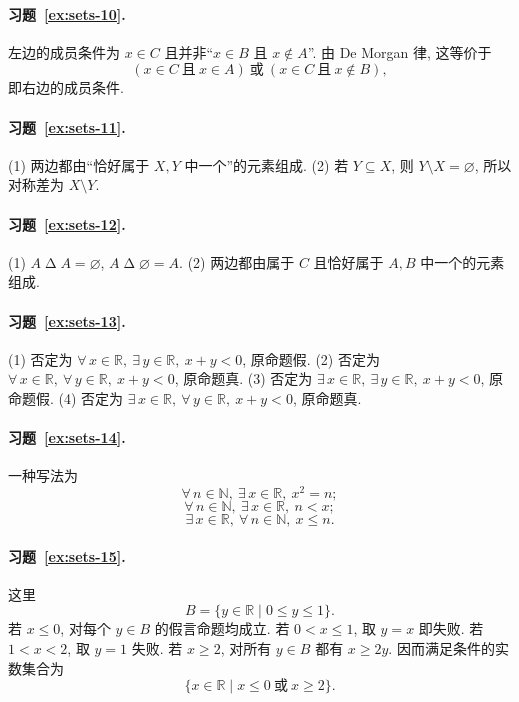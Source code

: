 \documentclass[usesamecnt, thmcnt=section, lang=cn, newtx, 10pt, scheme=chinese]{elegantbook}
\begin{document}
\paragraph*{习题~\ref{ex:sets-10}.}
左边的成员条件为 $x\in C$ 且并非``$x\in B$ 且 $x\notin A$''. 由 De Morgan 律, 这等价于
\[
 (x\in C\ \text{且}\ x\in A)
 \ \text{或}\ 
 (x\in C\ \text{且}\ x\notin B),
\]
即右边的成员条件.

\paragraph*{习题~\ref{ex:sets-11}.}
(1) 两边都由``恰好属于 $X,Y$ 中一个''的元素组成. (2) 若 $Y\subseteq X$, 则 $Y\setminus X=\varnothing$, 所以对称差为 $X\setminus Y$.

\paragraph*{习题~\ref{ex:sets-12}.}
(1) $A\mathbin\Delta A=\varnothing$, $A\mathbin\Delta\varnothing=A$. (2) 两边都由属于 $C$ 且恰好属于 $A,B$ 中一个的元素组成.

\paragraph*{习题~\ref{ex:sets-13}.}
(1) 否定为 $\forall\,x\in\mathbb R,\ \exists\,y\in\mathbb R,\ x+y<0$, 原命题假. (2) 否定为 $\forall\,x\in\mathbb R,\ \forall\,y\in\mathbb R,\ x+y<0$, 原命题真. (3) 否定为 $\exists\,x\in\mathbb R,\ \exists\,y\in\mathbb R,\ x+y<0$, 原命题假. (4) 否定为 $\exists\,x\in\mathbb R,\ \forall\,y\in\mathbb R,\ x+y<0$, 原命题真.

\paragraph*{习题~\ref{ex:sets-14}.}
一种写法为
\[
 \forall\,n\in\mathbb N,\ \exists\,x\in\mathbb R,\ x^2=n;
\]
\[
 \forall\,n\in\mathbb N,\ \exists\,x\in\mathbb R,\ n<x;
\]
\[
 \exists\,x\in\mathbb R,\ \forall\,n\in\mathbb N,\ x\leq n.
\]

\paragraph*{习题~\ref{ex:sets-15}.}
这里
\[
 B=\{y\in\mathbb R\mid 0\leq y\leq1\}.
\]
若 $x\leq0$, 对每个 $y\in B$ 的假言命题均成立. 若 $0<x\leq1$, 取 $y=x$ 即失败. 若 $1<x<2$, 取 $y=1$ 失败. 若 $x\geq2$, 对所有 $y\in B$ 都有 $x\geq2y$. 因而满足条件的实数集合为
\[
 \{x\in\mathbb R\mid x\leq0\ \text{或}\ x\geq2\}.
\]
\end{document}
